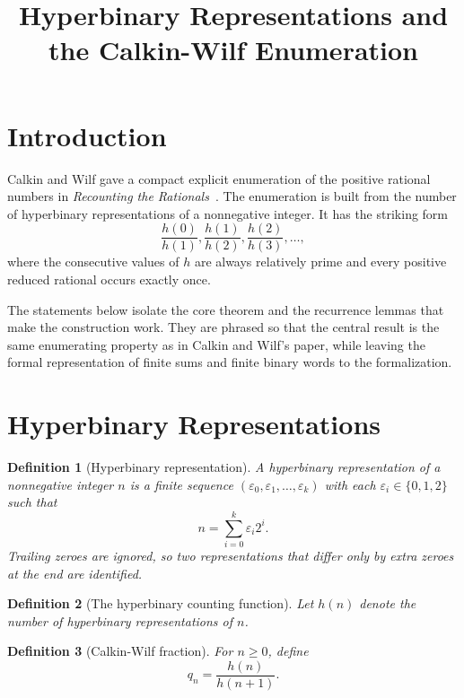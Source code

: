 \documentclass{article}
\title{Hyperbinary Representations and the Calkin-Wilf Enumeration}
\author{}
\date{}
\newtheorem{definition}{Definition}
\begin{document}
\maketitle

\section{Introduction}

Calkin and Wilf gave a compact explicit enumeration of the positive rational
numbers in \emph{Recounting the Rationals}~\cite{calkinwilf2000}.  The
enumeration is built from the number of hyperbinary representations of a
nonnegative integer.  It has the striking form
\[
  \frac{h(0)}{h(1)},\frac{h(1)}{h(2)},\frac{h(2)}{h(3)},\ldots,
\]
where the consecutive values of $h$ are always relatively prime and every
positive reduced rational occurs exactly once.

The statements below isolate the core theorem and the recurrence lemmas that
make the construction work.  They are phrased so that the central result is the
same enumerating property as in Calkin and Wilf's paper, while leaving the
formal representation of finite sums and finite binary words to the
formalization.

\section{Hyperbinary Representations}

\begin{definition}[Hyperbinary representation]\label{def:hyperbinary_representation}
A hyperbinary representation of a nonnegative integer $n$ is a finite sequence
$(\varepsilon_0,\varepsilon_1,\ldots,\varepsilon_k)$ with each
$\varepsilon_i\in\{0,1,2\}$ such that
\[
  n=\sum_{i=0}^{k}\varepsilon_i2^i.
\]
Trailing zeroes are ignored, so two representations that differ only by
extra zeroes at the end are identified.
\end{definition}

\begin{definition}[The hyperbinary counting function]\label{def:hyperbinary_count}
Let $h(n)$ denote the number of hyperbinary representations of $n$.
\end{definition}

\begin{definition}[Calkin-Wilf fraction]\label{def:calkin_wilf_fraction}
For $n\ge 0$, define
\[
  q_n=\frac{h(n)}{h(n+1)}.
\]
\end{definition}
\end{document}
